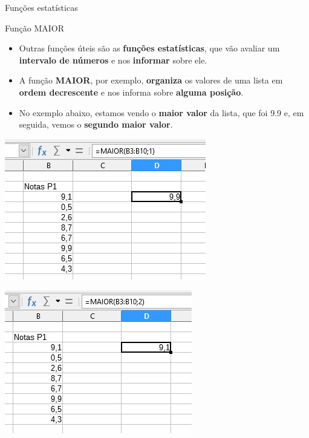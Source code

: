 \begin{frame}{Funções estatísticas}
	\begin{block}{Função MAIOR}
		\begin{itemize}
			\item Outras funções úteis são as \textbf{funções estatísticas}, que vão avaliar um \textbf{intervalo de números} e nos \textbf{informar} sobre ele.
			\item A função \textbf{MAIOR}, por exemplo, \textbf{organiza} os valores de uma lista em \textbf{ordem decrescente} e nos informa sobre \textbf{alguma posição}.
			\item No exemplo abaixo, estamos vendo o \textbf{maior valor} da lista, que foi \num{9,9} e, em seguida, vemos o \textbf{segundo maior valor}.
		\end{itemize}
	\end{block}
	
	\begin{minipage}{0.45\linewidth}
		\centering
		\includegraphics[width=1\linewidth]{Figuras/Ch06/fig50}
	\end{minipage}\hfill
	\begin{minipage}{0.45\linewidth}
		\centering
		\includegraphics[width=0.9\linewidth]{Figuras/Ch06/fig51}
	\end{minipage}
\end{frame}


